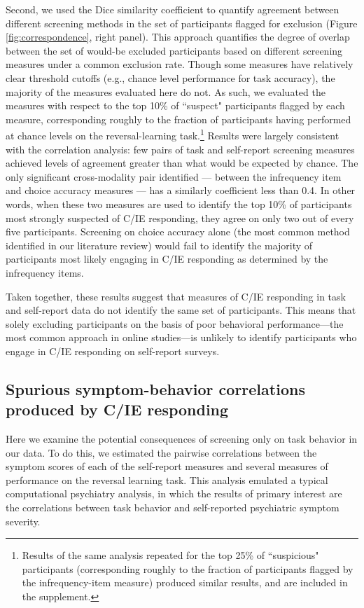 \documentclass[a4paper,notitlepage,12pt]{article}
\begin{document}
\begin{refsection}[main]
Second, we used the Dice similarity coefficient to quantify agreement between different screening methods in the set of participants flagged for exclusion (Figure \ref{fig:correspondence}, right panel). This approach quantifies the degree of overlap between the set of would-be excluded participants based on different screening measures under a common exclusion rate. Though some measures have relatively clear threshold cutoffs (e.g., chance level performance for task accuracy), the majority of the measures evaluated here do not. As such, we evaluated the measures with respect to the top 10\% of ``suspect" participants flagged by each measure, corresponding roughly to the fraction of participants having performed at chance levels on the reversal-learning task.\footnote{Results of the same analysis repeated for the top 25\% of ``suspicious" participants (corresponding roughly to the fraction of participants flagged by the infrequency-item measure) produced similar results, and are included in the supplement.} Results were largely consistent with the correlation analysis: few pairs of task and self-report screening measures achieved levels of agreement greater than what would be expected by chance. The only significant cross-modality pair identified --- between the infrequency item and choice accuracy measures --- has a similarly coefficient less than 0.4. In other words, when these two measures are used to identify the top 10\% of participants most strongly suspected of C/IE responding, they agree on only two out of every five participants. Screening on choice accuracy alone (the most common method identified in our literature review) would fail to identify the majority of participants most likely engaging in C/IE responding as determined by the infrequency items.

Taken together, these results suggest that measures of C/IE responding in task and self-report data do not identify the same set of participants. This means that solely excluding participants on the basis of poor behavioral performance---the most common approach in online studies---is unlikely to identify participants who engage in C/IE responding on self-report surveys. 

\subsection*{Spurious symptom-behavior correlations produced by C/IE responding}

Here we examine the potential consequences of screening only on task behavior in our data. To do this, we estimated the pairwise correlations between the symptom scores of each of the self-report measures and several measures of performance on the reversal learning task. This analysis emulated a typical computational psychiatry analysis, in which the results of primary interest are the correlations between task behavior and self-reported psychiatric symptom severity.


\end{refsection}
\end{document}
